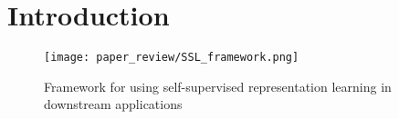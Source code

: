 
\section{Introduction}

\begin{figure}
    \centering
    \texttt{[image: paper\_review/SSL\_framework.png]}
	 \caption{Framework for using self-supervised representation learning in
	 downstream applications}
    \label{fig:SSL_framework}
\end{figure}








